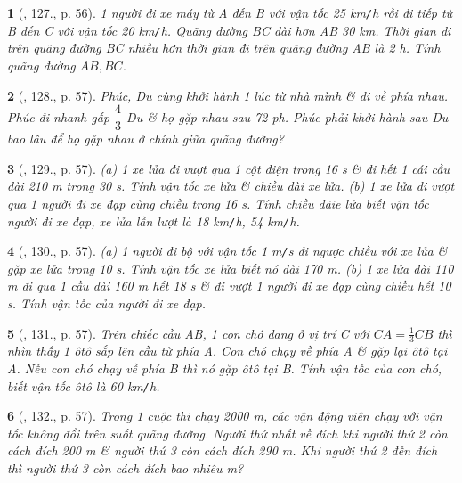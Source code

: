 \documentclass{article}
\newtheorem{baitoan}{}
\begin{document}
\begin{baitoan}[\cite{Binh_Toan_6_tap_2}, 127., p. 56]
	1 người đi xe máy từ A đến B với vận tốc {\rm25 km{\tt/}h} rồi đi tiếp từ B đến C với vận tốc {\rm20 km{\tt/}h}. Quãng đường BC dài hơn AB {\rm30 km}. Thời gian đi trên quãng đường BC nhiều hơn thời gian đi trên quãng đường AB là {\rm2 h}. Tính quãng đường $AB,BC$.
\end{baitoan}

\begin{baitoan}[\cite{Binh_Toan_6_tap_2}, 128., p. 57]
	Phúc, Du cùng khởi hành 1 lúc từ nhà mình \& đi về phía nhau. Phúc đi nhanh gấp $\dfrac{4}{3}$ Du \& họ gặp nhau sau {\rm72 ph}. Phúc phải khởi hành sau Du bao lâu để họ gặp nhau ở chính giữa quãng đường?
\end{baitoan}

\begin{baitoan}[\cite{Binh_Toan_6_tap_2}, 129., p. 57]
	(a) 1 xe lửa đi vượt qua 1 cột điện trong {\rm16 s} \& đi hết 1 cái cầu dài {\rm210 m} trong {\rm30 s}. Tính vận tốc xe lửa \& chiều dài xe lửa. (b) 1 xe lửa đi vượt qua 1 người đi xe đạp cùng chiều trong {\rm16 s}. Tính chiều dãie lửa biết vận tốc người đi xe đạp, xe lửa lần lượt là {\rm18 km{\tt/}h, 54 km{\tt/}h}.
\end{baitoan}

\begin{baitoan}[\cite{Binh_Toan_6_tap_2}, 130., p. 57]
	(a) 1 người đi bộ với vận tốc {\rm1 m{\tt/}s} đi ngược chiều với xe lửa \& gặp xe lửa trong {\rm10 s}. Tính vận tốc xe lửa biết nó dài {\rm170 m}. (b) 1 xe lửa dài {\rm110 m} đi qua 1 cầu dài {\rm160 m} hết {\rm18 s} \& đi vượt 1 người đi xe đạp cùng chiều hết {\rm10 s}. Tính vận tốc của người đi xe đạp.
\end{baitoan}

\begin{baitoan}[\cite{Binh_Toan_6_tap_2}, 131., p. 57]
	Trên chiếc cầu AB, 1 con chó đang ở vị trí C với $CA = \frac{1}{3}CB$ thì nhìn thấy 1 ôtô sắp lên cầu từ phía A. Con chó chạy về phía A \& gặp lại ôtô tại A. Nếu con chó chạy về phía B thì nó gặp ôtô tại B. Tính vận tốc của con chó, biết vận tốc ôtô là {\rm60 km{\tt/}h}.
\end{baitoan}

\begin{baitoan}[\cite{Binh_Toan_6_tap_2}, 132., p. 57]
	Trong 1 cuộc thi chạy {\rm2000 m}, các vận động viên chạy với vận tốc không đổi trên suốt quãng đường. Người thứ nhất về đích khi người thứ 2 còn cách đích {\rm200 m} \& người thứ 3 còn cách đích {\rm290 m}. Khi người thứ 2 đến đích thì người thứ 3 còn cách đích bao nhiêu {\rm m}?
\end{baitoan}
\end{document}
